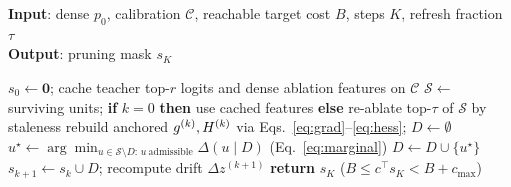 \begin{algorithm}[t]
\caption{\method (calibration-only anchored continuation)}
\label{alg:flow}
\textbf{Input}: dense $p_0$, calibration $\mathcal{C}$, reachable target cost $B$, steps $K$, refresh fraction $\tau$\\
\textbf{Output}: pruning mask $s_K$
\begin{algorithmic}[1]
\STATE $s_0\!\leftarrow\!\mathbf{0}$; cache teacher top-$r$ logits and dense ablation features on $\mathcal{C}$
  \STATE $\mathcal{S}\!\leftarrow$ surviving units; \textbf{if} $k{=}0$ \textbf{then} use cached features \textbf{else} re-ablate top-$\tau$ of $\mathcal{S}$ by staleness
  \STATE rebuild anchored $g^{(k)},H^{(k)}$ via Eqs.~\eqref{eq:grad}--\eqref{eq:hess}; $D\!\leftarrow\!\emptyset$
    \STATE $u^\star\!\leftarrow\!\arg\min_{u\in\mathcal{S}\setminus D:\,u\ \mathrm{admissible}}\Delta(u\mid D)$ \hfill (Eq.~\ref{eq:marginal})
    \STATE $D\!\leftarrow\!D\cup\{u^\star\}$
  \ENDWHILE
  \STATE $s_{k+1}\!\leftarrow\!s_k\cup D$; recompute drift $\Delta z^{(k+1)}$
\ENDFOR
\STATE \textbf{return} $s_K$ \hfill ($B\le c^\top s_K<B+c_{\max}$)
\end{algorithmic}
\end{algorithm}

